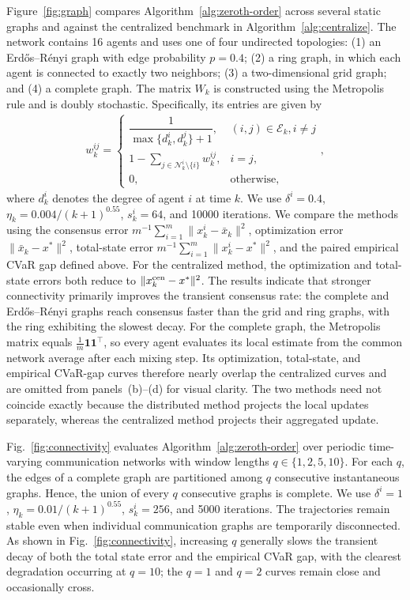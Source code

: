 \documentclass[twocolumn]{autart}    %
\newcommand{\1}{\mathbf{1}}
\begin{document}
Figure~\ref{fig:graph} compares Algorithm~\ref{alg:zeroth-order} across several static graphs and against the centralized benchmark in Algorithm~\ref{alg:centralize}. The network contains 16 agents and uses one of four undirected topologies: (1) an Erd\H{o}s--R\'enyi graph with edge probability $p=0.4$;
(2) a ring graph, in which each agent is connected to exactly two neighbors; 
(3) a two-dimensional grid graph; and (4) a complete graph.
The matrix $W_k$ is
constructed using the Metropolis rule and is doubly stochastic. Specifically,
its entries are given by
\begin{align*}
w_k^{ij} =\left\{
\begin{array}{ll}
\dfrac{1}{\max\{d_k^i,d_k^j\}+1},
& (i,j)\in\mathcal{E}_k, i\neq j \\
  1-\displaystyle\sum_{j\in\mathcal{N}_k^i\setminus\{i\}}w_k^{ij},
& i=j,\\
0,
& \text{otherwise},
\end{array}\right., 
 \end{align*}
where $d_k^i$ denotes the degree of agent $i$ at time $k$. 
We use $\delta^i=0.4$, $\eta_k=0.004/(k+1)^{0.55}$, $s_k^i=64$, and 10000 iterations. 
We compare the methods using the consensus error $m^{-1}\sum_{i=1}^{m}\|x_k^i-\bar{x}_k\|^2$, 
optimization error $\|\bar{x}_k-x^\ast\|^2$, total-state error $m^{-1}\sum_{i=1}^{m}\|x_k^i-x^\ast\|^2$, 
and the paired empirical CVaR gap defined above. 
For the centralized method, the optimization and total-state errors both reduce to $\|x_k^{\rm cen}-x^\ast\|^2$.  
The results indicate that stronger connectivity primarily improves the transient consensus rate: the complete and Erd\H{o}s--R\'enyi graphs reach consensus faster than the grid and ring graphs, with the ring exhibiting the slowest decay.
For the complete graph, the Metropolis matrix equals $\frac{1}{m}\mathbf 1\mathbf 1^\top$, 
so every agent evaluates its local estimate from the common network average after each mixing step. 
Its optimization, total-state, and empirical CVaR-gap curves therefore nearly overlap the centralized curves 
and are omitted from panels~(b)--(d) for visual clarity. 
The two methods need not coincide exactly because the distributed method projects the local updates separately, 
whereas the centralized method projects their aggregated update. 

Fig.~\ref{fig:connectivity} evaluates Algorithm~\ref{alg:zeroth-order} 
over periodic time-varying communication networks with window lengths $q\in\{1,2,5,10\}$. 
For each $q$, the edges of a complete graph are partitioned among $q$ consecutive instantaneous graphs. 
Hence, the union of every $q$ consecutive graphs is complete. 
We use $\delta^i=1$, $\eta_k=0.01/(k+1)^{0.55}$, $s_k^i=256$, 
and 5000 iterations. 
The trajectories remain stable even when individual communication graphs are temporarily disconnected. As shown in Fig.~\ref{fig:connectivity}, increasing $q$ generally slows the transient decay of both the total state error and the empirical CVaR gap,  with the clearest degradation occurring at $q=10$; the $q=1$ and $q=2$ curves remain close and occasionally cross.
 
\end{document}
